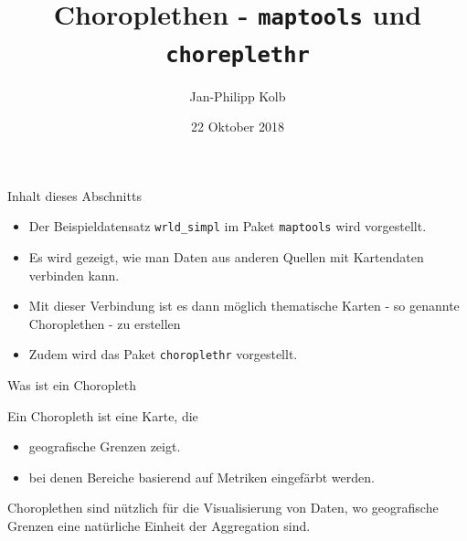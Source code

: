 \documentclass[ignorenonframetext,]{beamer}
\title{Choroplethen - \texttt{maptools} und \texttt{choreplethr}}
\author{Jan-Philipp Kolb}
\date{22 Oktober 2018}
\providecommand{\tightlist}{%
  \setlength{\itemsep}{0pt}\setlength{\parskip}{0pt}}
\begin{document}
\frame{\titlepage}

\begin{frame}[fragile]{Inhalt dieses Abschnitts}
\protect\hypertarget{inhalt-dieses-abschnitts}{}

\begin{itemize}
\tightlist
\item
  Der Beispieldatensatz \texttt{wrld\_simpl} im Paket \texttt{maptools}
  wird vorgestellt.
\item
  Es wird gezeigt, wie man Daten aus anderen Quellen mit Kartendaten
  verbinden kann.
\item
  Mit dieser Verbindung ist es dann möglich thematische Karten - so
  genannte Choroplethen - zu erstellen
\item
  Zudem wird das Paket \texttt{choroplethr} vorgestellt.
\end{itemize}

\end{frame}

\begin{frame}{Was ist ein Choropleth}
\protect\hypertarget{was-ist-ein-choropleth}{}

Ein Choropleth ist eine Karte, die

\begin{itemize}
\tightlist
\item
  geografische Grenzen zeigt.
\item
  bei denen Bereiche basierend auf Metriken eingefärbt werden.
\end{itemize}

Choroplethen sind nützlich für die Visualisierung von Daten, wo
geografische Grenzen eine natürliche Einheit der Aggregation sind.

\end{frame}
\end{document}
